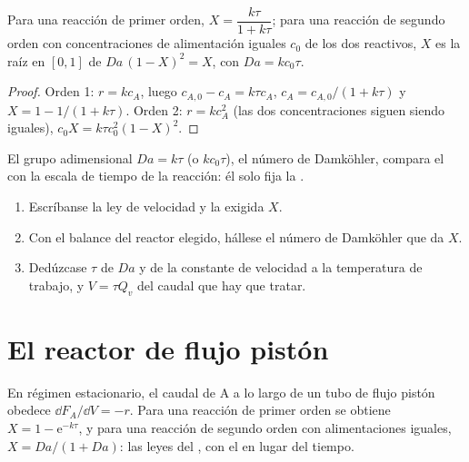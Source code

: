 \begin{theorem}\label{thm:b2:continuous-reactors:cstr}
Para una reacción de primer orden, $X = \dfrac{k\tau}{1 + k\tau}$; para una
reacción de segundo orden con concentraciones de alimentación iguales $c_0$ de los dos
reactivos, $X$ es la raíz en $[0, 1]$ de $Da\,(1 - X)^2 = X$, con $Da =
kc_0\tau$.
\end{theorem}

\begin{proof}
Orden 1: $r = kc_A$, luego $c_{A,0} - c_A = k\tau c_A$, $c_A = c_{A,0}/(1 + k\tau)$
y $X = 1 - 1/(1 + k\tau)$. Orden 2: $r = kc_A^2$ (las dos concentraciones siguen
siendo iguales), $c_0X = k\tau c_0^2(1 - X)^2$.
\end{proof}

El grupo adimensional $Da = k\tau$ (o $kc_0\tau$), el número de
Damköhler, compara el  con la escala de tiempo de la reacción:
él solo fija la .

\begin{method}\label{met:b2:continuous-reactors:size-reactor}
\begin{enumerate}
  \item Escríbanse la ley de velocidad y la  exigida $X$.
  \item Con el balance del reactor elegido, hállese el número de Damköhler
        que da $X$.
  \item Dedúzcase $\tau$ de $Da$ y de la constante de velocidad a la temperatura de
        trabajo, y $V = \tau Q_v$ del caudal que hay que tratar.
\end{enumerate}
\end{method}

\section{El reactor de flujo pistón}

\begin{theorem}\label{thm:b2:continuous-reactors:pfr}
En régimen estacionario, el caudal de A a lo largo de un tubo de flujo pistón obedece
$\dd F_A/\dd V = -r$. Para una reacción de primer orden se obtiene $X = 1 -
\mathrm e^{-k\tau}$, y para una reacción de segundo orden con alimentaciones iguales, $X =
Da/(1 + Da)$: las leyes del , con el  en
lugar del tiempo.
\end{theorem}


